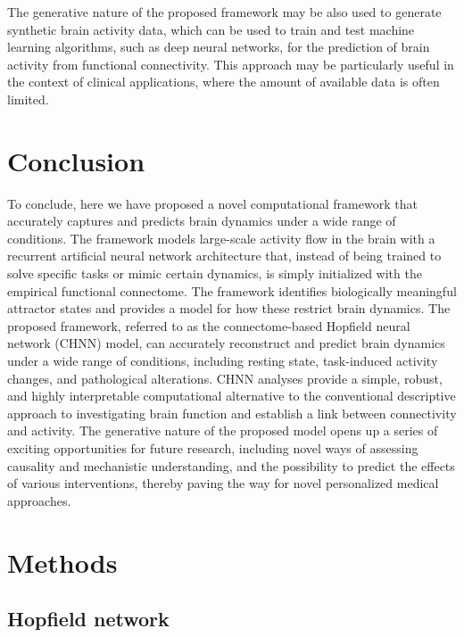 \documentclass{article}
\begin{document}
The generative nature of the proposed framework may be also used to generate synthetic brain activity data, which can
be used to train and test machine learning algorithms, such as deep neural networks, for the prediction of brain
activity from functional connectivity. This approach may be particularly useful in the context of clinical applications,
where the amount of available data is often limited.

\section{\textbf{Conclusion}}\label{Conclusion}

To conclude, here we have proposed a novel computational framework that accurately captures and predicts brain dynamics
under a wide range of conditions. The framework models large-scale activity flow in the brain with a recurrent
artificial neural network architecture that, instead of being trained to solve specific tasks or mimic certain dynamics,
is simply initialized with the empirical functional connectome. The framework identifies biologically meaningful
attractor states and provides a model for how these restrict brain dynamics. The proposed framework, referred to as the
connectome-based Hopfield neural network (CHNN) model, can accurately reconstruct and predict brain dynamics under a wide range of
conditions, including resting state, task-induced activity changes, and pathological alterations. CHNN analyses provide
a simple, robust, and highly interpretable computational alternative to the conventional descriptive approach to
investigating brain function and establish a link between connectivity and activity. The generative nature of the
proposed model opens up a series of exciting opportunities for future research, including novel ways of assessing
causality and mechanistic understanding, and the possibility to predict the effects of various interventions, thereby
paving the way for novel personalized medical approaches.

\section{\textbf{Methods}}\label{Methods}

\subsection{Hopfield network}\label{Hopfield network}
\end{document}
